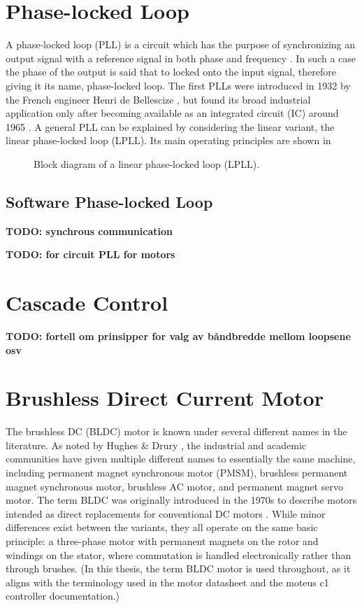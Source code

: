 \section{Phase-locked Loop}
A phase-locked loop (PLL) is a circuit which has the purpose of synchronizing an output signal
with a reference signal in both phase and frequency \citep[1]{best1993_pll}. In such a case the phase of the output
is said that to locked onto the input signal, therefore giving it its name, phase-locked loop. The first PLLs were introduced in
1932 by the French engineer Henri de Bellescize \cite{deBellescize1932ReceptionSynchrone}, but found its broad industrial application only after becoming available
as an integrated circuit (IC) around 1965 \citep{best1993_pll}. A general PLL can be explained by considering the linear variant,
the linear phase-locked loop (LPLL). Its main operating principles are shown in

\begin{figure}[H]
	\centering
	
	\caption{Block diagram of a linear phase-locked loop (LPLL).}
	\label{fig:pll-diagram}
\end{figure}


\subsection{Software Phase-locked Loop}
\textbf{TODO: synchrous communication}

\textbf{TODO: \citep{Moore1973PLL} for circuit PLL for motors}

\section{Cascade Control}
\textbf{TODO: fortell om prinsipper for valg av båndbredde mellom loopsene osv}

\section{Brushless Direct Current Motor}

The brushless DC (BLDC) motor is known under several different names in the literature. As noted by Hughes \& Drury \citep{hughes2013electric}, the industrial and academic communities have given multiple different names to essentially the same machine, including permanent magnet synchronous motor (PMSM), brushless permanent magnet synchronous motor, brushless AC motor, and permanent magnet servo motor. The term BLDC was originally introduced in the 1970s to describe motors intended as direct replacements for conventional DC motors \cite{hughes2013electric}. While minor differences exist between the variants, they all operate on the same basic principle: a three-phase motor with permanent magnets on the rotor and windings on the stator, where commutation is handled electronically rather than through brushes. (In this thesis, the term BLDC motor is used throughout, as it aligns with the terminology used in the motor datasheet and the moteus c1 controller documentation.)

